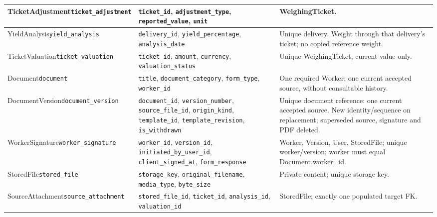 {\begin{longtable}{L{0.27}L{0.4}L{0.33}}
\midrule
TicketAdjustment\newline \texttt{ticket\_\allowbreak{}adjustment} & \mbox{\texttt{ticket\_id}}, \mbox{\texttt{adjustment\_type}}, \mbox{\texttt{reported\_value}}, \mbox{\texttt{unit}} & WeighingTicket. \\
\midrule
YieldAnalysis\newline \texttt{yield\_\allowbreak{}analysis} & \mbox{\texttt{delivery\_id}}, \mbox{\texttt{yield\_percentage}}, \mbox{\texttt{analysis\_date}} & Unique delivery. Weight through that delivery's ticket; no copied reference weight. \\
\midrule
TicketValuation\newline \texttt{ticket\_\allowbreak{}valuation} & \mbox{\texttt{ticket\_id}}, \mbox{\texttt{amount}}, \mbox{\texttt{currency}}, \mbox{\texttt{valuation\_status}} & Unique WeighingTicket; current value only. \\
\midrule
Document\newline \texttt{document} & \mbox{\texttt{title}}, \mbox{\texttt{document\_category}}, \mbox{\texttt{form\_type}}, \mbox{\texttt{worker\_id}} & One required Worker; one current accepted source, without consultable history. \\
\midrule
DocumentVersion\newline \texttt{document\_\allowbreak{}version} & \mbox{\texttt{document\_id}}, \mbox{\texttt{version\_number}}, \mbox{\texttt{source\_file\_id}}, \mbox{\texttt{origin\_kind}}, \mbox{\texttt{template\_id}}, \mbox{\texttt{template\_revision}}, \mbox{\texttt{is\_withdrawn}} & Unique document reference: one current accepted source. New identity/sequence on replacement; superseded source, signature and PDF deleted. \\
\midrule
WorkerSignature\newline \texttt{worker\_\allowbreak{}signature} & \mbox{\texttt{worker\_id}}, \mbox{\texttt{version\_id}}, \mbox{\texttt{initiated\_by\_user\_id}}, \mbox{\texttt{client\_signed\_at}}, \mbox{\texttt{form\_response}} & Worker, Version, User, StoredFile; unique worker/version; worker must equal Document.worker\_id. \\
\midrule
StoredFile\newline \texttt{stored\_\allowbreak{}file} & \mbox{\texttt{storage\_key}}, \mbox{\texttt{original\_filename}}, \mbox{\texttt{media\_type}}, \mbox{\texttt{byte\_size}} & Private content; unique storage key. \\
\midrule
SourceAttachment\newline \texttt{source\_\allowbreak{}attachment} & \mbox{\texttt{stored\_file\_id}}, \mbox{\texttt{ticket\_id}}, \mbox{\texttt{analysis\_id}}, \mbox{\texttt{valuation\_id}} & StoredFile; exactly one populated target FK. \\

\end{longtable}}
